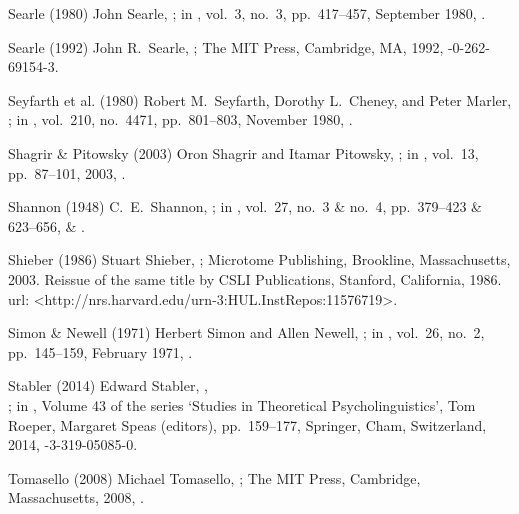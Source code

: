 \biblabel Searle (1980)
John Searle,
;
in ,
vol.\ 3, no.\ 3, pp.\ 417--457, September 1980,
.

\biblabel Searle (1992)
John R.\ Searle,
;
The MIT Press, Cambridge, MA, 1992,
-0-262-69154-3.

\biblabel Seyfarth et al. (1980)
Robert M.\ Seyfarth, Dorothy L.\ Cheney, and Peter Marler,
;
in ,
vol.\ 210, no.\ 4471, pp.\ 801--803, November 1980,
.

\biblabel Shagrir \& Pitowsky (2003)
Oron Shagrir and Itamar Pitowsky,
;
in ,
vol.\ 13, pp.\ 87--101, 2003,
.

\biblabel Shannon (1948)
C.\ E.\ Shannon,
;
in ,
vol.\ 27, no.\ 3 \& no.\ 4, pp.\ 379--423 \& 623--656,
 \&
.

\biblabel Shieber (1986)
Stuart Shieber,
;
Microtome Publishing, Brookline, Massachusetts, 2003.
Reissue of the same title by
CSLI Publications, Stanford, California, 1986.\\
{\sc url:} \URL<http://nrs.harvard.edu/urn-3:HUL.InstRepos:11576719>.

\biblabel Simon \& Newell (1971)
Herbert Simon and Allen Newell,
;
in ,
 vol.\ 26, no.\ 2, pp.\ 145--159, February 1971,
.

\biblabel Stabler (2014)
Edward Stabler,
,\\
;
in ,
Volume 43 of the series ‘Studies in Theoretical Psycholinguistics’,
Tom Roeper, Margaret Speas (editors),
pp.\ 159--177,
Springer, Cham, Switzerland, 2014,
-3-319-05085-0.

\biblabel Tomasello (2008)
Michael Tomasello,
;
The MIT Press, Cambridge, Massachusetts, 2008,
.


